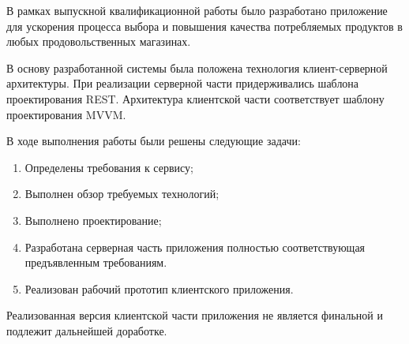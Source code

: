 В рамках выпускной квалификационной работы было разработано приложение для ускорения процесса выбора и повышения качества потребляемых продуктов в любых продовольственных магазинах.

В основу разработанной системы была положена технология клиент-серверной архитектуры. При реализации серверной части придерживались шаблона проектирования REST. Архитектура клиентской части соответствует шаблону проектирования MVVM.
 
В ходе выполнения работы были решены следующие задачи:
\begin{enumerate}
	\item Определены требования к сервису;
	\item Выполнен обзор требуемых технологий;
	\item Выполнено проектирование;
	\item Разработана серверная часть приложения полностью соответствующая предъявленным требованиям.
	\item Реализован рабочий прототип клиентского приложения.
\end{enumerate}

Реализованная версия клиентской части приложения не является финальной и подлежит дальнейшей доработке.

\clearpage